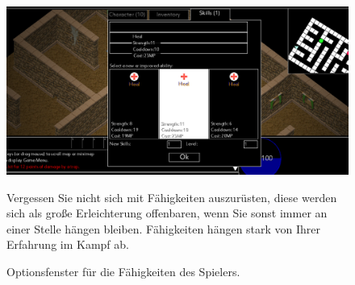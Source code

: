 \documentclass[12pt, a4paper]{scrreprt}
\begin{document}
\begin{figure}[h]
\includegraphics[width=\textwidth]{img/skills}
\caption{Optionsfenster für die Fähigkeiten des Spielers.}
\vspace{1cm}
Vergessen Sie nicht sich mit Fähigkeiten auszurüsten, diese werden sich als große Erleichterung offenbaren, wenn Sie sonst immer an einer Stelle hängen bleiben. Fähigkeiten hängen stark von Ihrer Erfahrung im Kampf ab.
\end{figure}
\end{document}
